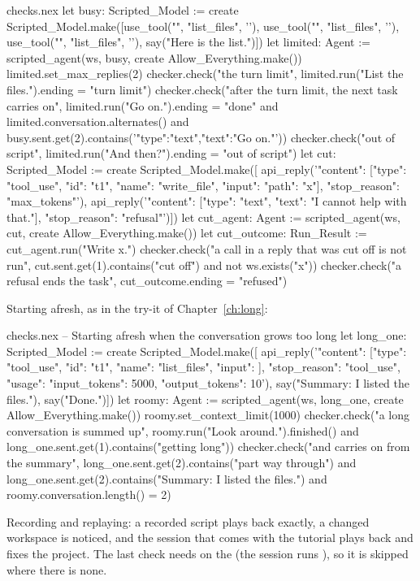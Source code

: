 \begin{continued}{checks.nex}
let busy: Scripted_Model := create Scripted_Model.make([use_tool("", "list_files", '{}'),
  use_tool("", "list_files", '{}'), use_tool("", "list_files", '{}'), say("Here is the list.")])
let limited: Agent := scripted_agent(ws, busy, create Allow_Everything.make())
limited.set_max_replies(2)
checker.check("the turn limit", limited.run("List the files.").ending = "turn limit")
checker.check("after the turn limit, the next task carries on",
  limited.run("Go on.").ending = "done" and limited.conversation.alternates()
  and busy.sent.get(2).contains('{"type":"text","text":"Go on."}'))
checker.check("out of script", limited.run("And then?").ending = "out of script")
let cut: Scripted_Model := create Scripted_Model.make([
  api_reply('{"content": [{"type": "tool_use", "id": "t1", "name": "write_file", "input": {"path": "x"}}], "stop_reason": "max_tokens"}'),
  api_reply('{"content": [{"type": "text", "text": "I cannot help with that."}], "stop_reason": "refusal"}')])
let cut_agent: Agent := scripted_agent(ws, cut, create Allow_Everything.make())
let cut_outcome: Run_Result := cut_agent.run("Write x.")
checker.check("a call in a reply that was cut off is not run",
  cut.sent.get(1).contains("cut off") and not ws.exists("x"))
checker.check("a refusal ends the task", cut_outcome.ending = "refused")
\end{continued}

Starting afresh, as in the try-it of Chapter~\ref{ch:long}:

\begin{continued}{checks.nex}
-- Starting afresh when the conversation grows too long
let long_one: Scripted_Model := create Scripted_Model.make([
  api_reply('{"content": [{"type": "tool_use", "id": "t1", "name": "list_files", "input": {}}], "stop_reason": "tool_use", "usage": {"input_tokens": 5000, "output_tokens": 10}}'),
  say("Summary: I listed the files."),
  say("Done.")])
let roomy: Agent := scripted_agent(ws, long_one, create Allow_Everything.make())
roomy.set_context_limit(1000)
checker.check("a long conversation is summed up", roomy.run("Look around.").finished()
  and long_one.sent.get(1).contains("getting long"))
checker.check("and carries on from the summary", long_one.sent.get(2).contains("part way through")
  and long_one.sent.get(2).contains("Summary: I listed the files.") and roomy.conversation.length() = 2)
\end{continued}

Recording and replaying: a recorded script plays back exactly, a changed
workspace is noticed, and the session that comes with the tutorial plays
back and fixes the project. The last check needs  on the
 (the session runs ), so it is skipped
where there is none.


